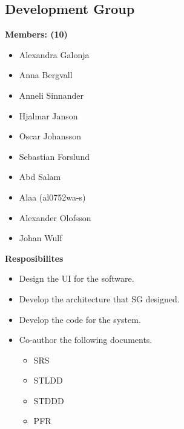 \documentclass{article}
\begin{document}
    \subsection{Development Group}
        \textbf{Members: (10)}
        \begin{itemize}
            \item Alexandra Galonja
            \item Anna Bergvall
            \item Anneli Sinnander
            \item Hjalmar Janson
            \item Oscar Johansson
            \item Sebastian Forslund
            \item Abd Salam
            \item Alaa (al0752wa-s)
            \item Alexander Olofsson
            \item Johan Wulf
        \end{itemize}
        \textbf{Resposibilites}
        \begin{itemize}
            \item Design the UI for the software.
            \item Develop the architecture that SG designed.
            \item Develop the code for the system.
            \item Co-author the following documents.
                \begin{itemize}
                    \item SRS
                    \item STLDD
                    \item STDDD
                    \item PFR
                \end{itemize}
        \end{itemize}
    
\end{document}

